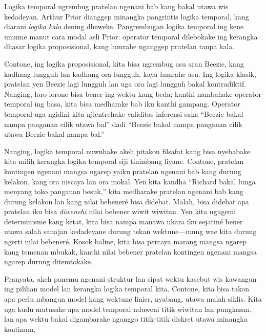 \documentclass[../../../include/open-logic-section]{subfiles}
\begin{document}


Logika temporal ngrembug pratelan ngenani bab kang bakal utawa wis
kedadeyan. Arthur Prior dianggep minangka pangrintis logika temporal,
kang diarani \emph{logika kala} dening dheweke. Pangrembugan logika
temporal ing kene umume manut cara modal asli Prior: operator temporal
dilebokake ing kerangka dhasar logika proposisional, kang lumrahe
nganggep pratelan tanpa kala.

Contone, ing logika proposisional, kita bisa ngrembug asu aran Beezie,
kang kadhang lungguh lan kadhang ora lungguh, kaya lumrahe asu.
Ing logika klasik, pratelan yen Beezie lagi lungguh lan uga ora lagi
lungguh bakal kontradiktif. Nanging, loro-lorone bisa bener ing
wektu kang beda; kanthi nambahake operator temporal ing basa,
kita bisa medharake bab iku kanthi gampang. Operator temporal uga
ngidini kita njlentrehake validitas inferensi saka ``Beezie bakal
nampa panganan cilik utawa bal'' dadi ``Beezie bakal nampa panganan
cilik utawa Beezie bakal nampa bal.''

Nanging, logika temporal nuwuhake akeh pitakon filsafat kang bisa
nyebabake kita milih kerangka logika temporal siji tinimbang liyane.
Contone, pratelan kontingen ngenani mangsa ngarep yaiku pratelan
ngenani bab kang durung kelakon, kang ora niscaya lan ora mokal.
Yen kita kandha ``Richard bakal lunga menyang toko panganan besuk,''
kita medharake pratelan ngenani bab kang durung kelakon lan kang
nilai bebeneré bisa didebat. Malah, bisa didebat apa pratelan iku
bisa \emph{diwenehi} nilai bebener wiwit wiwitan. Yen kita ngugemi
determinisme kang ketat, kita bisa nampa manawa ukara iku sejatiné
bener utawa salah sanajan kedadeyane durung tekan wektune---mung wae
kita durung ngerti nilai bebeneré. Kosok baline, kita bisa percaya
marang mangsa ngarep kang temenan mbukak, kanthi nilai bebener
pratelan kontingen ngenani mangsa ngarep durung ditemtokake.

Pranyata, akeh panemu ngenani struktur lan sipat wektu kasebut wis
kawangun ing pilihan model lan kerangka logika temporal kita.
Contone, kita bisa takon apa perlu mbangun model kang wektune
linier, nyabang, utawa malah siklis. Kita uga kudu mutusake apa
model temporal nduweni titik wiwitan lan pungkasan, lan apa wektu
bakal digambarake nganggo titik-titik diskret utawa minangka kontinum.
\end{document}
